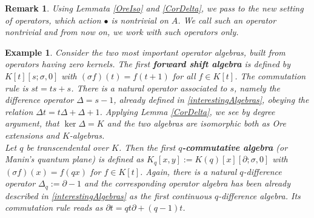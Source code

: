 \documentclass[a4paper,10pt]{article}
\newtheorem{remark}[Th]{Remark}
\newtheorem{ex}[Th]{Example}
\theoremstyle{nonumberplain}
\begin{document}
\begin{remark}
Using Lemmata \ref{OreIso} and \ref{CorDelta}, we pass to the new setting of operators, 
which action $\bullet$ is nontrivial on $A$. We call such an operator nontrivial and
from now on, we work with such operators only.
\end{remark}

\begin{ex}
Consider the two most important operator algebras, built from operators having zero kernels.
The first \textbf{forward shift algebra} is defined by
$K[t] \left[ s; \sigma, 0 \right]$ with $(\sigma f)(t) =  f(t + 1)$ for all $f \in K[t]$.
The commutation rule is $s t = t s + s$. There is a natural operator associated to $s$, namely the difference operator $\Delta = s-1$, already defined in \ref{interestingAlgebras}, obeying the relation $\Delta t = t \Delta + \Delta + 1$. Applying Lemma \ref{CorDelta}, we see by degree argument, that $\ker \Delta = K$ and the two algebras are isomorphic both as Ore extensions and $K$-algebras. \\
Let $q$ be transcendental over $K$. Then the first \textbf{$q$-commutative algebra} (or Manin's quantum plane) is defined as $K_q[x,y]:=K(q)[x][\partial;\sigma,0]$ with $(\sigma f)(x)=f(qx)$ for $f\in K[t]$. Again, there is a natural $q$-difference operator $\Delta_q := \partial - 1$ and the corresponding operator algebra has been already described in 
\ref{interestingAlgebras} as the first  continuous $q$-difference algebra. Its commutation rule reads as $\partial t = qt \partial + (q-1)t$.
\end{ex}
\end{document}
